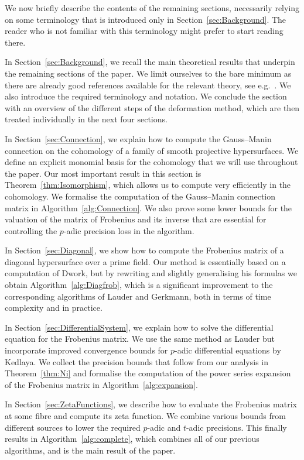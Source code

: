 \documentclass[a4paper,11pt]{article}
\numberwithin{equation}{section}
\theoremstyle{definition}
\begin{document}
We now briefly describe the contents of the remaining sections,
necessarily relying on some terminology that is introduced only 
in Section~\ref{sec:Background}.  The reader who is not familiar 
with this terminology might prefer to start reading there.

In Section~\ref{sec:Background}, we recall the main theoretical results that 
underpin the remaining sections of the paper.  We limit ourselves to the bare 
minimum as there are already good references available for the relevant theory, 
see e.g.~\citep{Kedlaya2012}. We also introduce the required terminology and 
notation. We conclude the section with an overview of the different steps of 
the deformation method, which are then treated individually in the next four 
sections.

In Section~\ref{sec:Connection}, we explain how to compute the Gauss--Manin 
connection on the cohomology of a family of smooth projective hypersurfaces. 
We define an explicit monomial basis for the cohomology that we will use 
throughout the paper. Our most important result in this section
is Theorem~\ref{thm:Isomorphism}, which allows us to compute very efficiently 
in the cohomology. We formalise the computation of the Gauss--Manin connection 
matrix in Algorithm~\ref{alg:Connection}. We also prove some lower bounds for 
the valuation of the matrix of Frobenius and its inverse that are essential 
for controlling the $p$-adic precision loss in the algorithm.

In Section~\ref{sec:Diagonal}, we show how to compute the Frobenius matrix of
a diagonal hypersurface over a prime field. Our method is essentially based 
on a computation of Dwork, but by rewriting and slightly generalising his formulas 
we obtain Algorithm~\ref{alg:Diagfrob}, which is a significant improvement to the 
corresponding algorithms of Lauder and Gerkmann, both in terms of time complexity 
and in practice.

In Section~\ref{sec:DifferentialSystem}, we explain how to solve the 
differential equation for the Frobenius matrix. We use the same method as 
Lauder but incorporate improved convergence bounds for $p$-adic differential 
equations by Kedlaya. We collect the precision bounds that follow from our 
analysis in Theorem~\ref{thm:Ni} and formalise the computation of the power 
series expansion of the Frobenius matrix in Algorithm~\ref{alg:expansion}.

In Section~\ref{sec:ZetaFunctions}, we describe how to evaluate the Frobenius 
matrix at some fibre and compute its zeta function. We combine various bounds 
from different sources to lower the required $p$-adic and $t$-adic precisions. 
This finally results in Algorithm~\ref{alg:complete}, which combines all of 
our previous algorithms, and is the main result of the paper.
\end{document}
